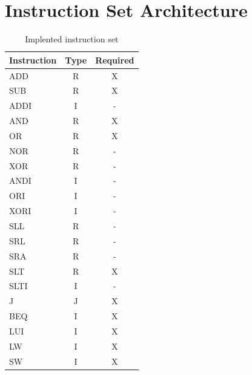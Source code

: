 \chapter{Instruction Set Architecture}
\label{app:isa}
\begin{table}[h]
  \centering
    \begin{tabular}{l|c|c}
    Instruction & Type & Required \\ \hline
    ADD         & R    & X        \\
    SUB         & R    & X        \\
    ADDI        & I    & -        \\
    AND         & R    & X        \\
    OR          & R    & X        \\
    NOR         & R    & -        \\
    XOR         & R    & -        \\
    ANDI        & I    & -        \\
    ORI         & I    & -        \\
    XORI        & I    & -        \\
    SLL         & R    & -        \\
    SRL         & R    & -        \\
    SRA         & R    & -        \\
    SLT         & R    & X        \\
    SLTI        & I    & -        \\
    J           & J    & X        \\
    BEQ         & I    & X        \\
    LUI         & I    & X        \\
    LW          & I    & X        \\
    SW          & I    & X        \\
    \end{tabular}
    \caption {Implented instruction set}
    \label{table:instruction-types}
\end{table}
